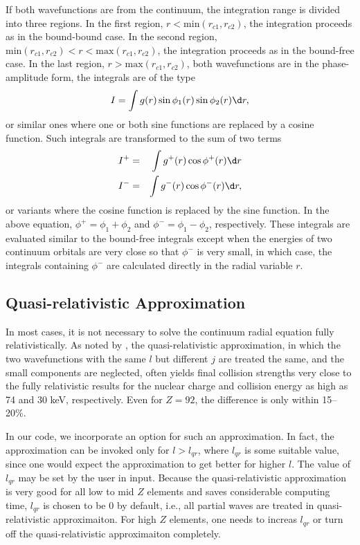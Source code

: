 \documentclass{elsart}
\begin{document}
If both wavefunctions are from the continuum, the integration range is divided
into three regions. In the first region, $r < \mbox{min}(r_{c1}, r_{c2})$, the
integration proceeds as in the bound-bound case. In the second region,
$\mbox{min}(r_{c1}, r_{c2}) < r < \mbox{max}(r_{c1}, r_{c2})$, the integration
proceeds as in the bound-free 
case. In the last region, $r > \mbox{max}(r_{c1}, r_{c2})$, both wavefunctions
are in the phase-amplitude form, the integrals are of the type 
\begin{equation}
I = \int g(r) \sin\phi_1(r)\sin\phi_2(r) \d r,
\end{equation}
or similar ones where one or both sine functions are replaced by a cosine
function. Such integrals are transformed to the sum of two terms
\begin{eqnarray}
I^+ &=& \int g^+(r)\cos\phi^+(r)\d r \nonumber \\
I^- &=& \int g^-(r)\cos\phi^-(r)\d r ,
\end{eqnarray}
or variants where the cosine function is replaced by the sine function. In the
above equation, $\phi^+ = \phi_1 + \phi_2$ and $\phi^- = \phi_1 -\phi_2$,
respectively. These 
integrals are evaluated similar to the bound-free integrals except when the
energies of two continuum orbitals are very close so that $\phi^-$ is very
small, in 
which case, the integrals containing $\phi^-$ are calculated directly in the
radial variable $r$. 

\subsection{Quasi-relativistic Approximation}
In most cases, it is not necessary to solve the continuum radial equation
fully relativistically. As noted by \citet{zhang89}, the quasi-relativistic
approximation, in which the two wavefunctions with the same $l$ but different
$j$ are treated the same, and the small components are neglected, often yields
final collision strengths very close to the fully relativistic
results for the nuclear charge and collision energy as high as 74 and 30 keV,
respectively. Even for $Z = 92$, the difference is only within 15--20\%. 

In our code, we incorporate an option for such an approximation. In fact, the
approximation can be invoked only for $l > l_{qr}$, where $l_{qr}$ is some
suitable value, since one would expect the approximation to get better for
higher $l$. The value of $l_{qr}$ may be set by the user in input. Because
the quasi-relativistic approximation is very good for all low to mid $Z$
elements and saves 
considerable computing time, $l_{qr}$ is chosen to be 0 by default, i.e., all
partial waves are treated in quasi-relativistic approximaiton. For high $Z$
elements, one needs to increas $l_{qr}$ or turn off the quasi-relativistic
approximaiton completely.
\end{document}
